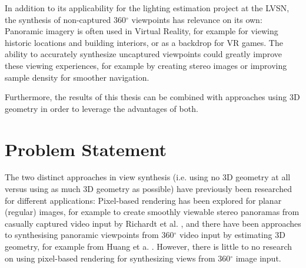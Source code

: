  In addition to its applicability for the lighting estimation project at the LVSN, the synthesis of non-captured 360$^{\circ}$ viewpoints has relevance on its own: Panoramic imagery is often used in Virtual Reality, for example for viewing historic locations and building interiors, or as a backdrop for VR games. The ability to accurately synthesize uncaptured viewpoints could greatly improve these viewing experiences, for example by creating stereo images or improving sample density for smoother navigation.

Furthermore, the results of this thesis can be combined with approaches using 3D geometry in order to leverage the advantages of both.

%

\section*{Problem Statement}


The two distinct approaches in view synthesis (i.e. using no 3D geometry at all versus using as much 3D geometry as possible) have previously been researched for different applications:
Pixel-based rendering has been explored for planar (regular) images, for example to create smoothly viewable stereo panoramas from casually captured video input by Richardt et al. \cite{megastereo}, and there have been approaches to synthesising panoramic viewpoints from 360$^{\circ}$ video input by estimating 3D geometry, for example from Huang et a. \cite{6dof}. However, there is little to no research on using pixel-based rendering for synthesizing views from 360$^{\circ}$ image input. 


